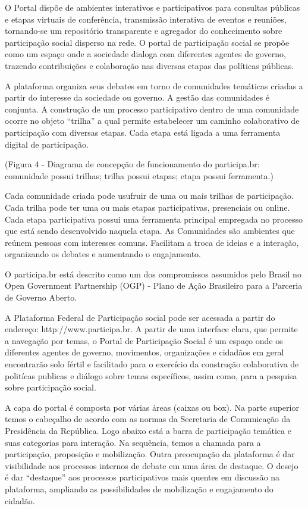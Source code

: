 \documentclass{article}
\begin{document}
O Portal dispõe de ambientes interativos e participativos para consultas
públicas e etapas virtuais de conferência, transmissão interativa de eventos e
reuniões, tornando-se um repositório transparente e agregador do conhecimento
sobre participação social disperso na rede. O portal de participação social se
propõe como um espaço onde a sociedade dialoga com diferentes agentes de
governo, trazendo contribuições e colaboração nas diversas etapas das políticas
públicas.

A plataforma organiza seus debates em torno de comunidades temáticas criadas a
partir do interesse da sociedade ou governo. A gestão das comunidades é
conjunta. A construção de um processo participativo dentro de uma comunidade
ocorre no objeto ``trilha'' a qual permite estabelecer um caminho colaborativo de
participação com diversas etapas. Cada etapa está ligada a uma ferramenta
digital de participação.  

(Figura 4 - Diagrama de concepção de funcionamento do participa.br: comunidade
possui trilhas; trilha possui etapas; etapa possui ferramenta.)

Cada comunidade criada pode usufruir de uma ou mais trilhas de participação.
Cada trilha pode ter uma ou mais etapas participativas, presenciais ou online.
Cada etapa participativa possui uma ferramenta principal empregada no processo
que está sendo desenvolvido naquela etapa. As Comunidades são ambientes que
reúnem pessoas com interesses comuns. Facilitam a troca de ideias e a
interação, organizando os debates e aumentando o engajamento. 

O participa.br está descrito como um dos compromissos assumidos pelo Brasil no
Open Government Partnership (OGP) - Plano de Ação Brasileiro para a Parceria de
Governo Aberto.

A Plataforma Federal de Participação social pode ser acessada a partir do
endereço: http://www.participa.br. A partir de uma interface clara, que permite
a navegação por temas, o Portal de Participação Social é um espaço onde os
diferentes agentes de governo, movimentos, organizações e cidadãos em geral
encontrarão solo fértil e facilitado para o exercício da construção
colaborativa de politícas publicas e diálogo sobre temas específicos, assim
como, para a pesquisa sobre participação social.

A capa do portal é composta por várias áreas (caixas ou box). Na parte superior
temos o cabeçalho de acordo com as normas da Secretaria de Comunicação da
Presidência da República. Logo abaixo está a barra de participação temática e
suas categorias para interação. Na sequência, temos a chamada para a
participação, proposição e mobilização. Outra preocupação da plataforma é dar
visibilidade aos processos internos de debate em uma área de destaque. O desejo
é dar ``destaque'' aos processos participativos mais quentes em discussão na
plataforma, ampliando as possibilidades de mobilização e engajamento do
cidadão.
\end{document}
